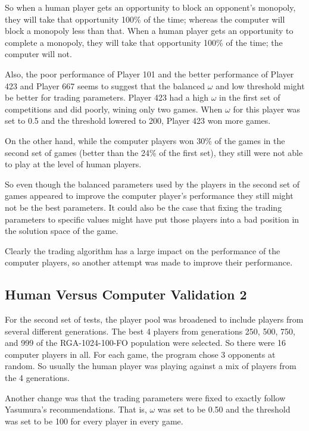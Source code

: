 So when a human player gets an opportunity to block an opponent's monopoly, they
will take that opportunity 100\% of the time; whereas the computer will block a
monopoly less than that. When a human player gets an opportunity to complete a
monopoly, they will take that opportunity 100\% of the time; the computer will
not.

Also, the poor performance of Player 101 and the better performance of Player
423 and Player 667 seems to suggest that the balanced \(\omega\) and low 
threshold might be better for trading parameters. Player 423 had a high 
\(\omega\) in the first set of competitions and did poorly, wining only two 
games. When \(\omega\) for this player was set to 0.5 and the threshold lowered
to 200, Player 423 won more games. 

On the other hand, while the computer players won 30\% of the games in the
second set of games (better than the 24\% of the first set), they still were not
able to play at the level of human players. 

So even though the balanced parameters used by the players in the second set of
games appeared to improve the computer player's performance they still might not
be the best parameters. It could also be the case that fixing the trading
parameters to specific values might have put those players into a bad position
in the solution space of the game.

Clearly the trading algorithm has a large impact on the performance of the 
computer players, so another attempt was made to improve their performance.

\subsection{Human Versus Computer Validation 2} \label{6_humanVRGA2}

For the second set of tests, the player pool was broadened to include players
from several different generations. The best 4 players from generations 250,
500, 750, and 999 of the RGA-1024-100-FO population were selected. So there were
16 computer players in all. For each game, the program chose 3 opponents at
random. So usually the human player was playing against a mix of players from
the 4 generations.

Another change was that the trading parameters were fixed to exactly follow
Yasumura's recommendations. That is, \(\omega\) was set to be 0.50 and the
threshold was set to be 100 for every player in every game.

